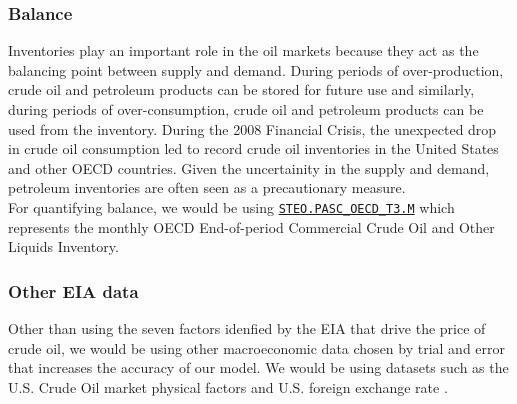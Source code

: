 \subsubsection{Balance}

Inventories \cite{impactinvent} play an important role in the oil markets because they act as the balancing point between supply and demand. During periods of over-production, crude oil and petroleum products can be stored for future use and similarly, during periods of over-consumption, crude oil and petroleum products can be used from the inventory. During the 2008 Financial Crisis, the unexpected drop in crude oil consumption led to record crude oil inventories in the United States and other OECD countries. Given the uncertainity in the supply and demand, petroleum inventories are often seen as a precautionary measure. \\

For quantifying balance, we would be using \href{https://www.eia.gov/opendata/qb.php?sdid=STEO.PASC_OECD_T3.M}{\texttt{STEO.PASC\_OECD\_T3.M}} which represents the monthly OECD End-of-period Commercial Crude Oil and Other Liquids Inventory.

\subsubsection{Other EIA data}

Other than using the seven factors \cite{sevenfactors} idenfied by the EIA that drive the price of crude oil, we would be using other macroeconomic data chosen by trial and error that increases the accuracy of our model. We would be using datasets such as the U.S. Crude Oil market physical factors \cite{physcial} and U.S. foreign exchange rate \cite{forex}.

